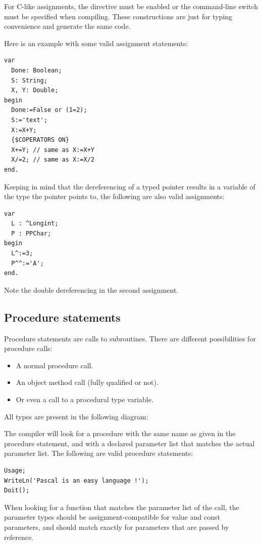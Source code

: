 For C-like assignments, the  directive must be enabled
or the  command-line switch must be specified when compiling.
These constructions are just for typing convenience and generate the same code.

\begin{remark}
Here is an example with some valid assignment statements:
\begin{verbatim}
var
  Done: Boolean;
  S: String;
  X, Y: Double;
begin
  Done:=False or (1=2);
  S:='text';
  X:=X+Y;
  {$COPERATORS ON}
  X+=Y; // same as X:=X+Y
  X/=2; // same as X:=X/2
end.
\end{verbatim}
\end{remark}

Keeping in mind that the dereferencing of a typed pointer results
in a variable of the type the pointer points to, the following are
also valid assignments:
\begin{verbatim}
var
  L : ^Longint;
  P : PPChar;
begin
  L^:=3;
  P^^:='A';
end.
\end{verbatim}
Note the double dereferencing in the second assignment.
\subsection{Procedure statements}
Procedure statements are calls to subroutines. There are
different possibilities for procedure calls:
\begin{itemize}
\item A normal procedure call.
\item An object method call (fully qualified or not).
\item Or even a call to a procedural type variable.
\end{itemize}
All types are present in the following diagram:

The \fpc compiler will look for a procedure with the same name as given in
the procedure statement, and with a declared parameter list that matches the
actual parameter list.
The following are valid procedure statements:
\begin{verbatim}
Usage;
WriteLn('Pascal is an easy language !');
Doit();
\end{verbatim}
\begin{remark}
When looking for a function that matches the parameter list of the call,
the parameter types should be assignment-compatible for value and const
parameters, and should match exactly for parameters that are passed by
reference.
\end{remark}

